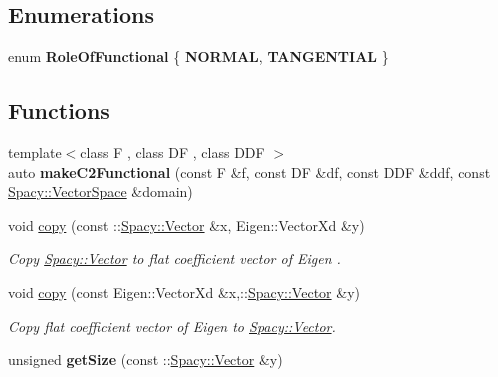 \subsection*{Enumerations}
\begin{DoxyCompactItemize}
\item 
enum {\bfseries Role\+Of\+Functional} \{ {\bfseries N\+O\+R\+M\+AL}, 
{\bfseries T\+A\+N\+G\+E\+N\+T\+I\+AL}
 \}\hypertarget{namespaceSpacy_1_1Rn_aee7e25f60746a8c2a5a647d7af05fdf1}{}\label{namespaceSpacy_1_1Rn_aee7e25f60746a8c2a5a647d7af05fdf1}

\end{DoxyCompactItemize}
\subsection*{Functions}
\begin{DoxyCompactItemize}
\item 
{\footnotesize template$<$class F , class DF , class D\+DF $>$ }\\auto {\bfseries make\+C2\+Functional} (const F \&f, const DF \&df, const D\+DF \&ddf, const \hyperlink{classSpacy_1_1VectorSpace}{Spacy\+::\+Vector\+Space} \&domain)\hypertarget{namespaceSpacy_1_1Rn_af1d4ad0f90654bf2e6d3a9a2d3e5ffd1}{}\label{namespaceSpacy_1_1Rn_af1d4ad0f90654bf2e6d3a9a2d3e5ffd1}

\item 
void \hyperlink{namespaceSpacy_1_1Rn_a26ee11182adb7a8103aa502c4bb8a134}{copy} (const \+::\hyperlink{classSpacy_1_1Vector}{Spacy\+::\+Vector} \&x, Eigen\+::\+Vector\+Xd \&y)\hypertarget{namespaceSpacy_1_1Rn_a26ee11182adb7a8103aa502c4bb8a134}{}\label{namespaceSpacy_1_1Rn_a26ee11182adb7a8103aa502c4bb8a134}

\begin{DoxyCompactList}\small\item\em Copy \hyperlink{classSpacy_1_1Vector}{Spacy\+::\+Vector} to flat coefficient vector of Eigen . \end{DoxyCompactList}\item 
void \hyperlink{namespaceSpacy_1_1Rn_aa1b7ffd8e9af414e4e5118f39971ecc4}{copy} (const Eigen\+::\+Vector\+Xd \&x,\+::\hyperlink{classSpacy_1_1Vector}{Spacy\+::\+Vector} \&y)\hypertarget{namespaceSpacy_1_1Rn_aa1b7ffd8e9af414e4e5118f39971ecc4}{}\label{namespaceSpacy_1_1Rn_aa1b7ffd8e9af414e4e5118f39971ecc4}

\begin{DoxyCompactList}\small\item\em Copy flat coefficient vector of Eigen to \hyperlink{classSpacy_1_1Vector}{Spacy\+::\+Vector}. \end{DoxyCompactList}\item 
unsigned {\bfseries get\+Size} (const \+::\hyperlink{classSpacy_1_1Vector}{Spacy\+::\+Vector} \&y)\hypertarget{namespaceSpacy_1_1Rn_a3f36c8bb8bdede3ff8573631ee7f3e79}{}\label{namespaceSpacy_1_1Rn_a3f36c8bb8bdede3ff8573631ee7f3e79}


\end{DoxyCompactItemize}
